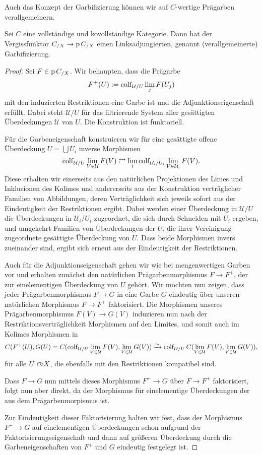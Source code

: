 Auch das Konzept der Garbifizierung können wir auf $C$-wertige
Prägarben verallgemeinern.
\begin{satz}
  Sei $C$ eine vollständige und kovollständige Kategorie. Dann hat der
  Vergissfunktor $C_{/X} \to \operatorname{p} C_{/X}$ einen Linksadjungierten,
  genannt (verallgemeinerte) Garbifizierung.
\end{satz}
\begin{proof}
  Sei $F \in \operatorname{p} C_{/X}$. Wir behaupten, dass die Prägarbe
  \[ F^+(U) :=   \operatorname{colf}\limits_{\mathcal{U}/U} \lim_j F(U_j) \]
  mit den induzierten Restriktionen eine Garbe ist und die
  Adjunktionseigenschaft erfüllt. Dabei steht $\mathcal{U}/U$ für das
  filtrierende System aller gesättigten Überdeckungen $\mathcal{U}$
  von $U$. Die Konstruktion ist funktoriell.

  Für die Garbeneigenschaft konstruieren wir für eine gesättigte
  offene Überdeckung $U = \bigcup U_i$ inverse Morphismen
  \[ \operatorname{colf}\limits_{\mathcal{U}/U} \lim_{V \in \mathcal{U}} F(V)
  \mathrel{\mathop{\rightleftarrows}}
  \lim_i \operatorname{colf}\limits_{\mathcal{U}_i/U_i} \lim_{V \in \mathcal{U}_i} F(V). \]
  Diese erhalten wir einerseits aus den natürlichen Projektionen des
  Limes und Inklusionen des Kolimes und andererseits aus der
  Konstruktion verträglicher Familien von Abbildungen, deren
  Verträglichkeit sich jeweils sofort aus der Eindeutigkeit der
  Restriktionen ergibt. Dabei werden einer Überdeckung in
  $\mathcal{U}/U$ die Überdeckungen in $\mathcal{U}_i/U_i$ zugeordnet,
  die sich durch Schneiden mit $U_i$ ergeben, und umgekehrt Familien
  von Überdeckungen der $U_i$ die ihrer Vereinigung zugeordnete
  gesättigte Überdeckung von $U$. Dass beide Morphismen invers
  zueinander sind, ergibt sich erneut aus der Eindeutigkeit der
  Restriktionen.

  Auch für die Adjunktionseigenschaft gehen wir wie bei mengenwertigen
  Garben vor und erhalten zunächst den natürlichen Prägarbenmorphismus
  $F \to F^+$, der zur einelementigen Überdeckung von $U$ gehört. Wir
  möchten nun zeigen, dass jeder Prägarbenmorphismus $F \to G$ in eine
  Garbe $G$ eindeutig über unseren natürlichen Morphismus $F \to F^+$
  faktorisiert. Die Morphismen unseres Prägarbenmorphismus $F(V) \to
  G(V)$ induzieren nun nach der Restriktionsverträglichkeit Morphismen
  auf den Limites, und somit auch im Kolimes Morphismen in
  \[ C(F^+(U), G(U) =
     C(\operatorname{colf}\limits_{\mathcal{U}/U} \lim_{V \in \mathcal{U}} F(V),
     \lim_{V \in \mathcal{U}} G(V)) \xrightarrow{\sim}
     \operatorname{colf}\limits_{\mathcal{U}/U}
     C(\lim_{V \in \mathcal{U}} F(V), \lim_{V \in \mathcal{U}} G(V)), \]
  für alle $U \subset\kern-0.58em\circ X$, die ebenfalls mit den Restriktionen kompatibel
  sind.

  Dass $F \to G$ nun mittels dieses Morphismus $F^+ \to G$ über $F \to
  F^+$ faktorisiert, folgt nun aber direkt, da der Morphismus für
  einelementige Überdeckungen der aus dem Prägarbenmorpismus ist.

  Zur Eindeutigkeit dieser Faktorisierung halten wir fest, dass der
  Morphismus $F^+ \to G$ auf einelementigen Überdeckungen schon
  aufgrund der Faktorisierungseigenschaft und dann auf größeren
  Überdeckung durch die Garbeneigenschaften von $F^+$ und $G$
  eindeutig festgelegt ist.
\end{proof}

